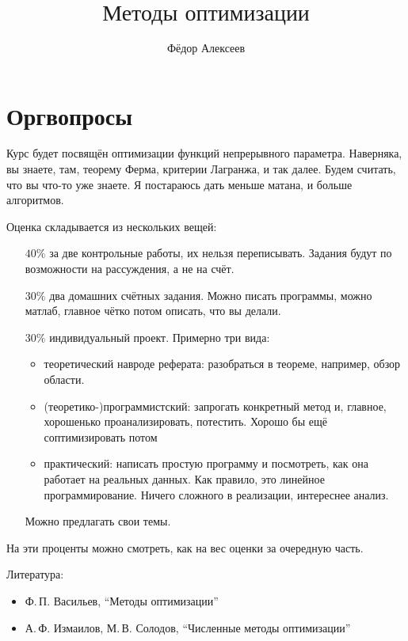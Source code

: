 



\title{$\mbox{Методы оптимизации}$}
\author{Фёдор Алексеев}

\maketitle
\gitlink{}
\tableofcontents\newpage{}


\section*{Оргвопросы}
Курс будет посвящён оптимизации функций непрерывного параметра.
Наверняка, вы знаете, там, теорему Ферма, критерии Лагранжа, и так далее.
Будем считать, что вы что-то уже знаете. Я постараюсь дать меньше матана, и больше алгоритмов.

Оценка складывается из нескольких вещей:
\begin{itemize}
  \item[$40\%$] за две контрольные работы, их нельзя переписывать.
    Задания будут по возможности на рассуждения, а не на счёт.
  \item[$30\%$] два домашних счётных задания. Можно писать программы, можно матлаб, главное чётко потом описать, что вы делали.
  \item[$30\%$] индивидуальный проект. Примерно три вида:
    \begin{itemize}
      \item теоретический навроде реферата: разобраться в теореме, например, обзор области.
      \item (теоретико-)программистский: запрогать конкретный метод и, главное, хорошенько проанализировать, потестить. Хорошо бы ещё соптимизировать потом
      \item практический: написать простую программу и посмотреть, как она работает на реальных данных. Как правило, это линейное программирование.
        Ничего сложного в реализации, интереснее анализ.
    \end{itemize}
    Можно предлагать свои темы.
\end{itemize}
На эти проценты можно смотреть, как на вес оценки за очередную часть.

Литература:
\begin{itemize}
  \item Ф.\,П. Васильев, ``Методы оптимизации''
  \item А.\,Ф. Измаилов, М.\,В. Солодов, ``Численные методы оптимизации''
\end{itemize}


